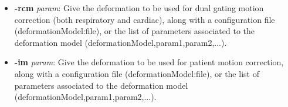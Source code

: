 \documentclass[a4paper, 11pt]{article}
\begin{document}
\begin{itemize}
\item \textbf{-rcm} \textit{param}: Give the deformation to be used for dual gating motion correction (both respiratory and cardiac), along with a configuration file (deformationModel:file), or the list of parameters associated to the deformation model (deformationModel,param1,param2,...).
\item \textbf{-im} \textit{param}: Give the deformation to be used for patient motion correction, along with a configuration file (deformationModel:file), or the list of parameters associated to the deformation model (deformationModel,param1,param2,...).
\end{itemize}


 
% 

\end{document}
